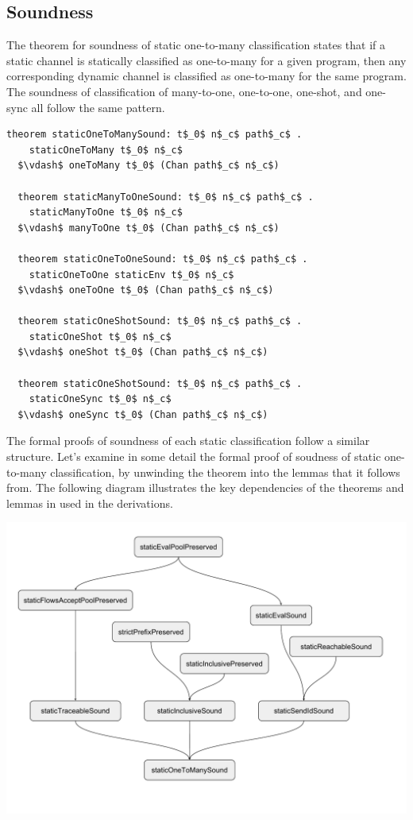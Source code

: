 \documentclass[letterpaper, 11pt]{report}
\begin{document}
\subsection{Soundness}

The theorem for soundness of static one-to-many classification states that if a static channel is
statically classified as one-to-many for a given program,
then any corresponding dynamic channel is classified
as one-to-many for the same program.
The soundness of classification of many-to-one, one-to-one, one-shot, and one-sync
all follow the same pattern.

\begin{lstlisting}[language=logic, mathescape]
  theorem staticOneToManySound: t$_0$ n$_c$ path$_c$ . 
    staticOneToMany t$_0$ n$_c$
  $\vdash$ oneToMany t$_0$ (Chan path$_c$ n$_c$)

  theorem staticManyToOneSound: t$_0$ n$_c$ path$_c$ . 
    staticManyToOne t$_0$ n$_c$
  $\vdash$ manyToOne t$_0$ (Chan path$_c$ n$_c$)

  theorem staticOneToOneSound: t$_0$ n$_c$ path$_c$ . 
    staticOneToOne staticEnv t$_0$ n$_c$
  $\vdash$ oneToOne t$_0$ (Chan path$_c$ n$_c$)

  theorem staticOneShotSound: t$_0$ n$_c$ path$_c$ .
    staticOneShot t$_0$ n$_c$
  $\vdash$ oneShot t$_0$ (Chan path$_c$ n$_c$)

  theorem staticOneShotSound: t$_0$ n$_c$ path$_c$ .
    staticOneSync t$_0$ n$_c$
  $\vdash$ oneSync t$_0$ (Chan path$_c$ n$_c$)
\end{lstlisting}

The formal proofs of soundness of each static classification follow a similar structure.
Let's examine in some detail the formal proof of soudness of static one-to-many classification,
by unwinding the theorem into the lemmas that it follows from. The following diagram illustrates
the key dependencies of the theorems and lemmas in used in the derivations.

\includegraphics[width=1\textwidth]{cml-proof-low.pdf}
\end{document}
